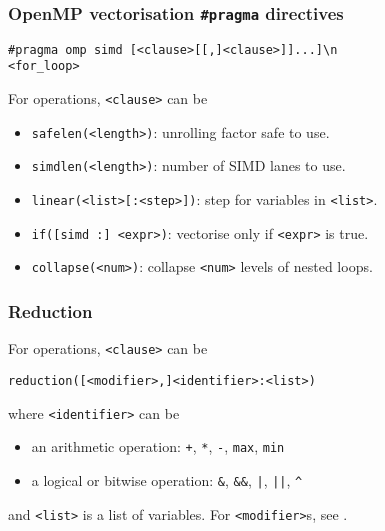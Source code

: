 \documentclass[14pt,aspectratio=169,dvipsnames,table]{beamer}
\begin{document}
\begin{frame}[fragile]
  \frametitle{OpenMP vectorisation \texttt{\#pragma} directives\hfill
    \href{https://www.openmp.org/spec-html/5.0/openmpsu42.html}
    {\large \faQuestionCircle}\;}
  \vspace{6pt}
\begin{lstlisting}
#pragma omp simd [<clause>[[,]<clause>]]...]\n
<for_loop>
\end{lstlisting}
  \vspace{6pt}
  For  operations, \verb#<clause># can be
  \vspace{6pt}
  \begin{itemize}[wide=0pt,itemsep=6pt,topsep=6pt]
  \item \verb#safelen(<length>)#: unrolling factor safe to use.
  \item \verb#simdlen(<length>)#: number of SIMD lanes to use.
  \item \verb#linear(<list>[:<step>])#: step for variables in \verb#<list>#.
  \item \verb#if([simd :] <expr>)#: vectorise only if \verb#<expr># is true.
  \item \verb#collapse(<num>)#: collapse \verb#<num># levels of nested loops.
  \end{itemize}
\end{frame}





\begin{frame}[fragile]
  \frametitle{Reduction}
  For  operations, \verb#<clause># can be
  \vspace{11pt}
\begin{lstlisting}
reduction([<modifier>,]<identifier>:<list>)
\end{lstlisting}
  \vspace{11pt}
  where \verb#<identifier># can be
  \begin{itemize}[wide=0pt,itemsep=11pt,topsep=11pt]
  \item an arithmetic operation: \verb#+#, \verb#*#, \verb#-#,
    \verb#max#, \verb#min#
  \item a logical or bitwise operation: \verb#&#, \verb#&&#,
    \verb#|#, \verb#||#, \verb#^#
  \end{itemize}
  \vspace{5pt}
  and \verb#<list># is a list of variables. For \verb#<modifier>#s, see
  \href{https://www.openmp.org/spec-html/5.0/openmpsu107.html}{\faQuestionCircle}.

\end{frame}
\end{document}
